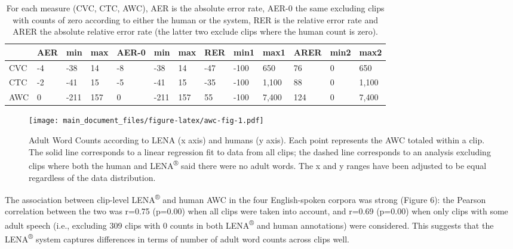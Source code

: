 \documentclass[english,table,man,floatsintext]{apa6}
\begin{document}
\begin{table}[tbp]

\begin{center}
\begin{threeparttable}

\caption{\label{tab:tabrers}For each measure (CVC, CTC, AWC), AER is the absolute error rate, AER-0 the same excluding clips with counts of zero according to either the human or the system, RER is the relative error rate and ARER the absolute relative error rate (the latter two exclude clips where the human count is zero). }

\begin{tabular}{lllllllllllll}
\toprule
 & \multicolumn{1}{c}{AER} & \multicolumn{1}{c}{min} & \multicolumn{1}{c}{max} & \multicolumn{1}{c}{AER-0} & \multicolumn{1}{c}{min} & \multicolumn{1}{c}{max} & \multicolumn{1}{c}{RER} & \multicolumn{1}{c}{min1} & \multicolumn{1}{c}{max1} & \multicolumn{1}{c}{ARER} & \multicolumn{1}{c}{min2} & \multicolumn{1}{c}{max2}\\
\midrule
CVC & -4 & -38 & 14 & -8 & -38 & 14 & -47 & -100 & 650 & 76 & 0 & 650\\
CTC & -2 & -41 & 15 & -5 & -41 & 15 & -35 & -100 & 1,100 & 88 & 0 & 1,100\\
AWC & 0 & -211 & 157 & 0 & -211 & 157 & 55 & -100 & 7,400 & 124 & 0 & 7,400\\
\bottomrule
\end{tabular}

\end{threeparttable}
\end{center}

\end{table}

\begin{figure}
\centering
\texttt{[image: main\_document\_files/figure-latex/awc-fig-1.pdf]}
\caption{\label{fig:awc-fig}Adult Word Counts according to LENA (x axis) and humans (y axis). Each point represents the AWC totaled within a clip. The solid line corresponds to a linear regression fit to data from all clips; the dashed line corresponds to an analysis excluding clips where both the human and LENA\textsuperscript{®} said there were no adult words. The x and y ranges have been adjusted to be equal regardless of the data distribution.}
\end{figure}

The association between clip-level LENA\textsuperscript{®} and human AWC in the four English-spoken corpora was strong (Figure 6): the Pearson correlation between the two was r=0.75 (p=0.00) when all clips were taken into account, and r=0.69 (p=0.00) when only clips with some adult speech (i.e., excluding 309 clips with 0 counts in both LENA\textsuperscript{®} and human annotations) were considered. This suggests that the LENA\textsuperscript{®} system captures differences in terms of number of adult word counts across clips well.
\end{document}
